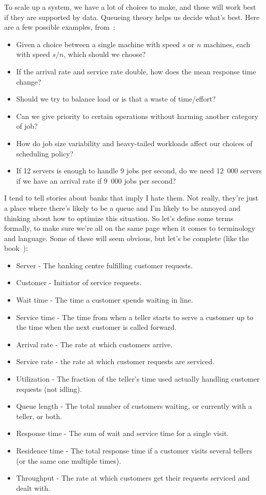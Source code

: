 \documentclass[a4paper]{report}
\begin{document}
To scale up a system, we have a lot of choices to make, and these will work best if they are supported by data. Queueing theory helps us decide what's best. Here are a few possible examples, from~\cite{pmd}:

\begin{itemize}
 \item Given a choice between a single machine with speed $s$ or $n$ machines, each with speed $s/n$, which should we choose?
 \item If the arrival rate and service rate double, how does the mean response time change?
 \item Should we try to balance load or is that a waste of time/effort?
 \item Can we give priority to certain operations without harming another category of job?
 \item How do job size variability and heavy-tailed workloads affect our choices of scheduling policy?
 \item If 12 servers is enough to handle 9 jobs per second, do we need 12~000 servers if we have an arrival rate if 9~000 jobs per second?
\end{itemize}

I tend to tell stories about banks that imply I hate them. Not really, they're just a place where there's likely to be a queue and I'm likely to be annoyed and thinking about how to optimize this situation. So let's define some terms formally, to make sure we're all on the same page when it comes to terminology and language. Some of these will seem obvious, but let's be complete (like the book~\cite{swps}):

\begin{itemize}
	\item Server - The banking centre fulfilling customer requests.
	\item Customer - Initiator of service requests.
	\item Wait time - The time a customer spends waiting in line.
	\item Service time - The time from when a teller starts to serve a customer up to the time when the next customer is called forward.
	\item Arrival rate - The rate at which customers arrive.
	\item Service rate - the rate at which customer requests are serviced.
	\item Utilization - The fraction of the teller's time used actually handling customer requests (not idling).
	\item Queue length - The total number of customers waiting, or currently with a teller, or both.
	\item Response time - The sum of wait and service time for a single visit.
	\item Residence time - The total response time if a customer visits several tellers (or the same one multiple times).
	\item Throughput - The rate at which customers get their requests serviced and dealt with.
\end{itemize}
\end{document}
